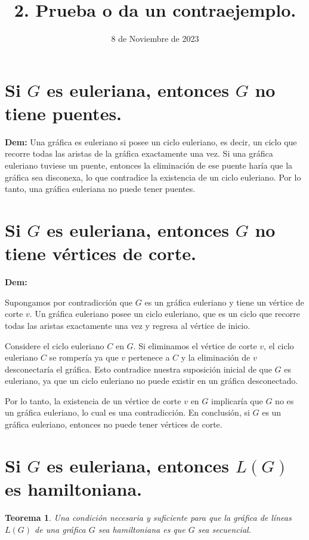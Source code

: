 \documentclass[12pt,spanish]{article}
\title{2. Prueba o da un contraejemplo.}
\date{8 de Noviembre de 2023}
\begin{document}
\maketitle

\section{Si \( G \) es euleriana, entonces \( G \) no tiene puentes.}
\textbf{Dem:} Una gráfica es euleriano si posee un ciclo euleriano, es decir, un ciclo que recorre todas las aristas de la gráfica exactamente una vez. Si una gráfica euleriano tuviese un puente, entonces la eliminación de ese puente haría que la gráfica sea disconexa, lo que contradice la existencia de un ciclo euleriano. Por lo tanto, una gráfica euleriana no puede tener puentes.

\section{Si \( G \) es euleriana, entonces \( G \) no tiene vértices de corte.}
\textbf{Dem:}

Supongamos por contradicción que \( G \) es un gráfica euleriano y tiene un vértice de corte \( v \). Un gráfica euleriano posee un ciclo euleriano, que es un ciclo que recorre todas las aristas exactamente una vez y regresa al vértice de inicio.

Considere el ciclo euleriano \( C \) en \( G \). Si eliminamos el vértice de corte \( v \), el ciclo euleriano \( C \) se rompería ya que \( v \) pertenece a \( C \) y la eliminación de \( v \) desconectaría el gráfica. Esto contradice nuestra suposición inicial de que \( G \) es euleriano, ya que un ciclo euleriano no puede existir en un gráfica desconectado.

Por lo tanto, la existencia de un vértice de corte \( v \) en \( G \) implicaría que \( G \) no es un gráfica euleriano, lo cual es una contradicción. En conclusión, si \( G \) es un gráfica euleriano, entonces no puede tener vértices de corte.


\section*{Si \( G \) es euleriana, entonces \( L(G) \) es hamiltoniana.}

\newtheorem{teorema}{Teorema}
\newtheorem{corolario}{Corolario}

\begin{teorema}
Una condición necesaria y suficiente para que la gráfica de líneas \( L(G) \) de una gráfica \( G \) sea hamiltoniana es que \( G \) sea secuencial.
\end{teorema}
\end{document}

